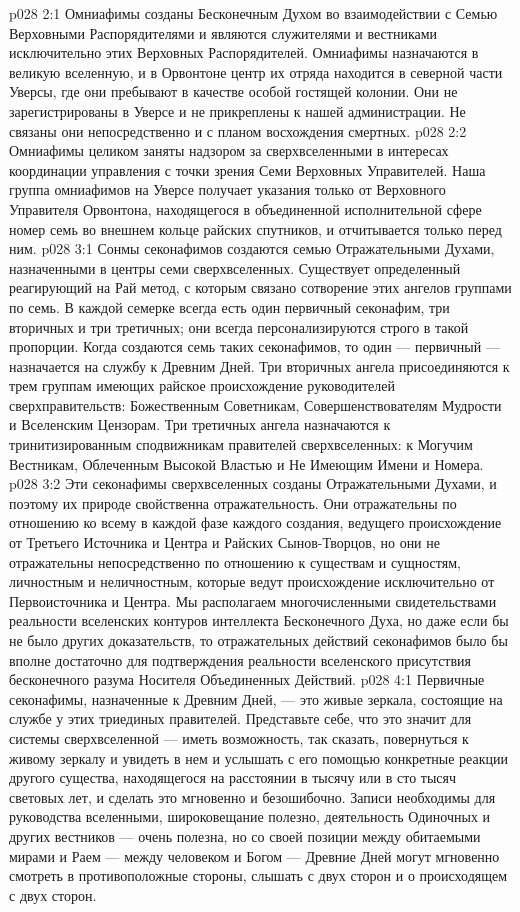 \vs p028 2:1 Омниафимы созданы Бесконечным Духом во взаимодействии с Семью Верховными Распорядителями и являются служителями и вестниками исключительно этих Верховных Распорядителей. Омниафимы назначаются в великую вселенную, и в Орвонтоне центр их отряда находится в северной части Уверсы, где они пребывают в качестве особой гостящей колонии. Они не зарегистрированы в Уверсе и не прикреплены к нашей администрации. Не связаны они непосредственно и с планом восхождения смертных.
\vs p028 2:2 Омниафимы целиком заняты надзором за сверхвселенными в интересах координации управления с точки зрения Семи Верховных Управителей. Наша группа омниафимов на Уверсе получает указания только от Верховного Управителя Орвонтона, находящегося в объединенной исполнительной сфере номер семь во внешнем кольце райских спутников, и отчитывается только перед ним.
\vs p028 3:1 Сонмы секонафимов создаются семью Отражательными Духами, назначенными в центры семи сверхвселенных. Существует определенный реагирующий на Рай метод, с которым связано сотворение этих ангелов группами по семь. В каждой семерке всегда есть один первичный секонафим, три вторичных и три третичных; они всегда персонализируются строго в такой пропорции. Когда создаются семь таких секонафимов, то один --- первичный --- назначается на службу к Древним Дней. Три вторичных ангела присоединяются к трем группам имеющих райское происхождение руководителей сверхправительств: Божественным Советникам, Совершенствователям Мудрости и Вселенским Цензорам. Три третичных ангела назначаются к тринитизированным сподвижникам правителей сверхвселенных: к Могучим Вестникам, Облеченным Высокой Властью и Не Имеющим Имени и Номера.
\vs p028 3:2 Эти секонафимы сверхвселенных созданы Отражательными Духами, и поэтому их природе свойственна отражательность. Они отражательны по отношению ко всему в каждой фазе каждого создания, ведущего происхождение от Третьего Источника и Центра и Райских Сынов\hyp{}Творцов, но они не отражательны непосредственно по отношению к существам и сущностям, личностным и неличностным, которые ведут происхождение исключительно от Первоисточника и Центра. Мы располагаем многочисленными свидетельствами реальности вселенских контуров интеллекта Бесконечного Духа, но даже если бы не было других доказательств, то отражательных действий секонафимов было бы вполне достаточно для подтверждения реальности вселенского присутствия бесконечного разума Носителя Объединенных Действий.
\vs p028 4:1 Первичные секонафимы, назначенные к Древним Дней, --- это живые зеркала, состоящие на службе у этих триединых правителей. Представьте себе, что это значит для системы сверхвселенной --- иметь возможность, так сказать, повернуться к живому зеркалу и увидеть в нем и услышать с его помощью конкретные реакции другого существа, находящегося на расстоянии в тысячу или в сто тысяч световых лет, и сделать это мгновенно и безошибочно. Записи необходимы для руководства вселенными, широковещание полезно, деятельность Одиночных и других вестников --- очень полезна, но со своей позиции между обитаемыми мирами и Раем --- между человеком и Богом --- Древние Дней могут мгновенно смотреть в противоположные стороны, слышать с двух сторон и  о происходящем с двух сторон.

